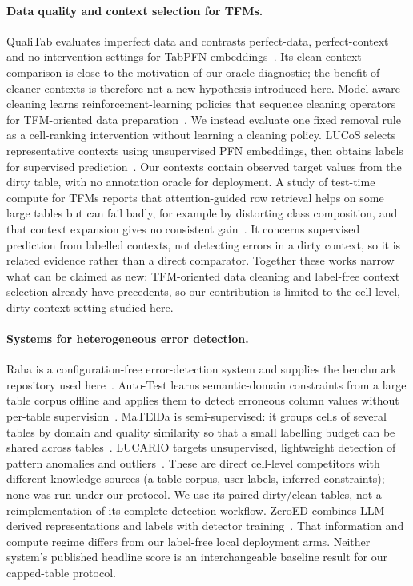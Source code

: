 \paragraph{Data quality and context selection for TFMs.}
QualiTab evaluates imperfect data and contrasts perfect-data, perfect-context
and no-intervention settings for TabPFN embeddings~\cite{papastergios2025wild}.
Its clean-context comparison is close to the motivation of our oracle diagnostic;
the benefit of cleaner contexts is therefore not a new hypothesis introduced here.
Model-aware cleaning learns reinforcement-learning policies that sequence cleaning
operators for TFM-oriented data
preparation~\cite{bertiequille2026prior}. We instead evaluate one fixed removal
rule as a cell-ranking intervention without learning a cleaning policy.
LUCoS selects representative contexts using unsupervised PFN embeddings,
then obtains labels for supervised prediction~\cite{ipas2026lucos}.
Our contexts contain observed target values from the dirty table, with no
annotation oracle for deployment. A study of test-time compute for TFMs reports that
attention-guided row retrieval helps on some large tables but can fail badly, for
example by distorting class composition, and that context expansion gives no
consistent gain~\cite{ning2026ttc}. It concerns supervised prediction from labelled
contexts, not detecting errors in a dirty context, so it is related evidence rather
than a direct comparator. Together these works narrow what can be claimed as new:
TFM-oriented data cleaning and label-free context selection already have precedents,
so our contribution is limited to the cell-level, dirty-context setting studied here.

\paragraph{Systems for heterogeneous error detection.}
Raha is a configuration-free error-detection system and supplies the benchmark
repository used here~\cite{mahdavi2019raha}.
Auto-Test learns semantic-domain constraints from a large table corpus offline and
applies them to detect erroneous column values without per-table
supervision~\cite{chen2025autotest}. MaTElDa is semi-supervised: it groups cells of
several tables by domain and quality similarity so that a small labelling budget
can be shared across tables~\cite{ahmadi2025matelda}. LUCARIO targets unsupervised,
lightweight detection of pattern anomalies and outliers~\cite{qin2026lucario}.
These are direct cell-level competitors with different knowledge sources (a table
corpus, user labels, inferred constraints); none was run under our protocol. We use its paired dirty/clean tables,
not a reimplementation of its complete detection workflow. ZeroED combines
LLM-derived representations and labels with detector training~\cite{zeroed2025}.
That information and compute regime differs from our label-free local deployment
arms.
Neither system's published headline score is an interchangeable baseline result
for our capped-table protocol.

